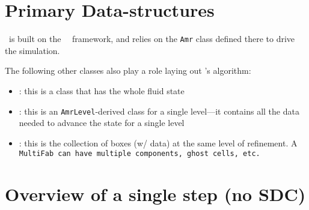 \section{Primary Data-structures}

\castro\ is built on the \cpp\ \boxlib\ framework, and relies on the
{\tt Amr} class defined there to drive the simulation.

The following other classes also play a role laying out \castro's
algorithm:
\begin{itemize}
\item {} : this is a class that has the whole fluid state 

\item {} : this is an {\tt AmrLevel}-derived class for a
  single level---it contains all the data needed to advance the state
  for a single level

\item {} : this is the collection of boxes (w/ data) at the 
  same level of refinement.  A \tt {\tt MultiFab} can have multiple
  components, ghost cells, etc.  

\end{itemize}


\section{Overview of a single step (no SDC)}

